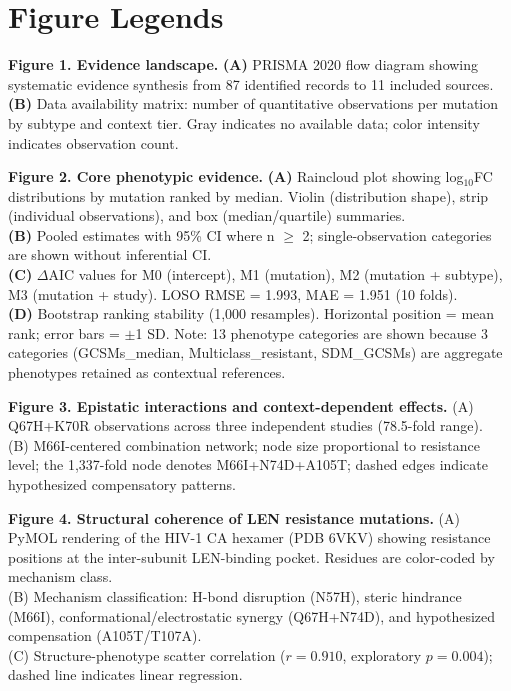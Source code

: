 \documentclass[12pt,a4paper]{article}
\begin{document}
\newpage
\section*{Figure Legends}

\textbf{Figure 1. Evidence landscape.}
\textbf{(A)} PRISMA 2020 flow diagram showing systematic evidence synthesis from 87 identified records to 11 included sources.\\
\textbf{(B)} Data availability matrix: number of quantitative observations per mutation by subtype and context tier. Gray indicates no available data; color intensity indicates observation count.

\textbf{Figure 2. Core phenotypic evidence.}
\textbf{(A)} Raincloud plot showing log$_{10}$FC distributions by mutation ranked by median. Violin (distribution shape), strip (individual observations), and box (median/quartile) summaries.\\
\textbf{(B)} Pooled estimates with 95\% CI where n $\geq$ 2; single-observation categories are shown without inferential CI.\\
\textbf{(C)} $\Delta$AIC values for M0 (intercept), M1 (mutation), M2 (mutation + subtype), M3 (mutation + study). LOSO RMSE = 1.993, MAE = 1.951 (10 folds).\\
\textbf{(D)} Bootstrap ranking stability (1,000 resamples). Horizontal position = mean rank; error bars = $\pm$1 SD. Note: 13 phenotype categories are shown because 3 categories (GCSMs\_median, Multiclass\_resistant, SDM\_GCSMs) are aggregate phenotypes retained as contextual references.

\textbf{Figure 3. Epistatic interactions and context-dependent effects.}
(A) Q67H+K70R observations across three independent studies (78.5-fold range).\\
(B) M66I-centered combination network; node size proportional to resistance level; the 1,337-fold node denotes M66I+N74D+A105T; dashed edges indicate hypothesized compensatory patterns.

\textbf{Figure 4. Structural coherence of LEN resistance mutations.}
(A) PyMOL rendering of the HIV-1 CA hexamer (PDB 6VKV) showing resistance positions at the inter-subunit LEN-binding pocket. Residues are color-coded by mechanism class.\\
(B) Mechanism classification: H-bond disruption (N57H), steric hindrance (M66I), conformational/electrostatic synergy (Q67H+N74D), and hypothesized compensation (A105T/T107A).\\
(C) Structure-phenotype scatter correlation ($r = 0.910$, exploratory $p = 0.004$); dashed line indicates linear regression.
\end{document}
